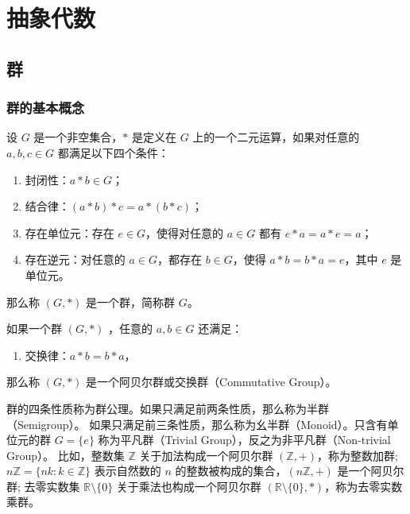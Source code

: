 \chapter{抽象代数}
\section{群}


\subsection{群的基本概念}

\begin{definition}[群 Group]
    设 $G$ 是一个非空集合，$*$ 是定义在 $G$ 上的一个二元运算，如果对任意的 $a, b, c\in G$ 都满足以下四个条件：
    \begin{enumerate}
        \item 封闭性：$a * b\in G$；
        \item 结合律：$(a * b) * c = a * (b * c)$；
        \item 存在单位元：存在 $e\in G$，使得对任意的 $a\in G$ 都有 $e * a = a * e = a$；
        \item 存在逆元：对任意的 $a\in G$，都存在 $b\in G$，使得 $a * b = b * a = e$，其中 $e$ 是单位元。
    \end{enumerate}
    那么称 $(G, *)$ 是一个群，简称群 $G$。
    \label{def:group}
\end{definition}
\vspace{1em}

\begin{definition}
    如果一个群 $(G, *)$ ，任意的 $a, b\in G$ 还满足：
    \begin{enumerate}
        \item 交换律：$a * b = b * a$，
    \end{enumerate}
    那么称 $(G, *)$ 是一个阿贝尔群或交换群（Commutative Group）。
    \label{def:abelian_group}
\end{definition}

\begin{note}
    群的四条性质称为群公理。如果只满足前两条性质，那么称为半群（Semigroup）。
    如果只满足前三条性质，那么称为幺半群（Monoid）。只含有单位元的群 $G=\{e\}$ 称为平凡群（Trivial Group），反之为非平凡群（Non-trivial Group）。
    比如，整数集 $\mathbb{Z}$ 关于加法构成一个阿贝尔群 $(\mathbb{Z}, +)$，称为整数加群;
    $n\mathbb{Z} = \{nk : k \in \mathbb{Z}\}$ 表示自然数的 $n$ 的整数被构成的集合，$(n\mathbb{Z}, +)$ 是一个阿贝尔群;
    去零实数集 $\mathbb{R}\setminus\{0\}$ 关于乘法也构成一个阿贝尔群 $(\mathbb{R}\setminus\{0\}, *)$，称为去零实数乘群。
\end{note}
\vspace{1em}

